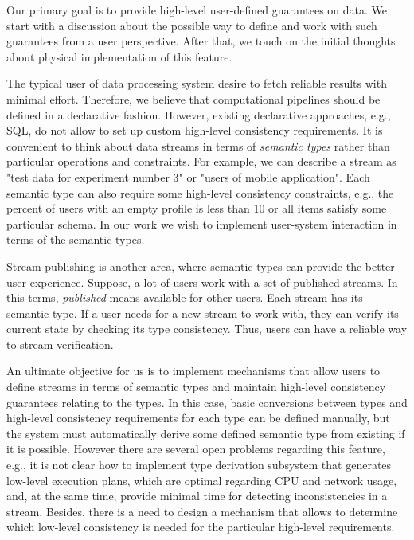 \label{fs-phd-reliable}

Our primary goal is to provide high-level user-defined guarantees on data. We start with a discussion about the possible way to define and work with such guarantees from a user perspective. After that, we touch on the initial thoughts about physical implementation of this feature.

The typical user of data processing system desire to fetch reliable results with minimal effort. Therefore, we believe that computational pipelines should be defined in a declarative fashion. However, existing declarative approaches, e.g., SQL, do not allow to set up custom high-level consistency requirements. It is convenient to think about data streams in terms of {\em semantic types} rather than particular operations and constraints. For example, we can describe a stream as "test data for experiment number 3" or "users of mobile application". Each semantic type can also require some high-level consistency constraints, e.g., the percent of users with an empty profile is less than 10 or all items satisfy some particular schema. In our work we wish to implement user-system interaction in terms of the semantic types.

Stream publishing is another area, where semantic types can provide the better user experience. Suppose, a lot of users work with a set of published streams. In this terms, {\em published} means available for other users. Each stream has its semantic type. If a user needs for a new stream to work with, they can verify its current state by checking its type consistency. Thus, users can have a reliable way to stream verification.

An ultimate objective for us is to implement mechanisms that allow users to define streams in terms of semantic types and maintain high-level consistency guarantees relating to the types. In this case, basic conversions between types and high-level consistency requirements for each type can be defined manually, but the system must automatically derive some defined semantic type from existing if it is possible. However there are several open problems regarding this feature, e.g., it is not clear how to implement type derivation subsystem that generates low-level execution plans, which are optimal regarding CPU and network usage, and, at the same time, provide minimal time for detecting inconsistencies in a stream. Besides, there is a need to design a mechanism that allows to determine which low-level consistency is needed for the particular high-level requirements.  

